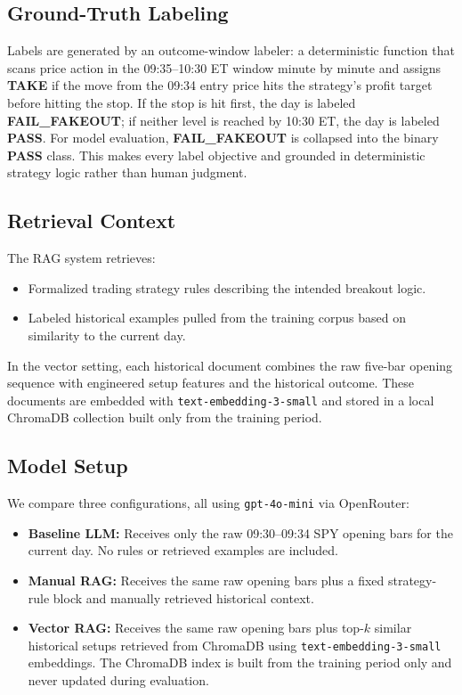 \documentclass{article}
\begin{document}
\subsection{Ground-Truth Labeling}

Labels are generated by an outcome-window labeler: a deterministic function that scans price action in the 09:35--10:30 ET window minute by minute and assigns \textbf{TAKE} if the move from the 09:34 entry price hits the strategy's profit target before hitting the stop. If the stop is hit first, the day is labeled \textbf{FAIL\_FAKEOUT}; if neither level is reached by 10:30 ET, the day is labeled \textbf{PASS}. For model evaluation, \textbf{FAIL\_FAKEOUT} is collapsed into the binary \textbf{PASS} class. This makes every label objective and grounded in deterministic strategy logic rather than human judgment.

\subsection{Retrieval Context}

The RAG system retrieves:
\begin{itemize}
    \item Formalized trading strategy rules describing the intended breakout logic.
    \item Labeled historical examples pulled from the training corpus based on similarity to the current day.
\end{itemize}

In the vector setting, each historical document combines the raw five-bar opening sequence with engineered setup features and the historical outcome. These documents are embedded with \texttt{text-embedding-3-small} and stored in a local ChromaDB collection built only from the training period.

\subsection{Model Setup}

We compare three configurations, all using \texttt{gpt-4o-mini} via OpenRouter:
\begin{itemize}
    \item \textbf{Baseline LLM:} Receives only the raw 09:30--09:34 SPY opening bars for the current day. No rules or retrieved examples are included.
    \item \textbf{Manual RAG:} Receives the same raw opening bars plus a fixed strategy-rule block and manually retrieved historical context.
    \item \textbf{Vector RAG:} Receives the same raw opening bars plus top-$k$ similar historical setups retrieved from ChromaDB using \texttt{text-embedding-3-small} embeddings. The ChromaDB index is built from the training period only and never updated during evaluation.
\end{itemize}
\end{document}
